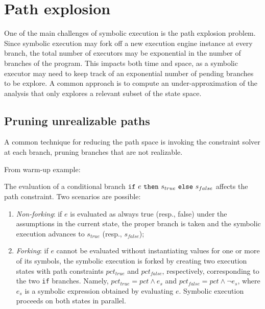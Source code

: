 
\section{Path explosion}

One of the main challenges of symbolic execution is the path explosion problem. Since symbolic execution may fork off a new execution engine instance at every branch, the total number of executors may be exponential in the number of branches of the program. This impacts both time and space, as a symbolic executor may need to keep track of an exponential number of pending branches to be explore. A common approach is to compute an under-approximation of the analysis that only explores a relevant subset of the state space.

\subsection{Pruning unrealizable paths}
\label{ss:unrealizable-paths}

A common technique for reducing the path space is invoking the constraint solver at each branch, pruning branches that are not realizable. 

From warm-up example:

The evaluation of a conditional branch ${\tt if}~e~{\tt then}~s_{true}~{\tt else}~s_{false}$ affects the path constraint. Two scenarios are possible:
    \begin{enumerate}
      \item {\em Non-forking}: if $e$ is evaluated as always true (resp., false) under the assumptions in the current state, the proper branch is taken and the symbolic execution advances to $s_{true}$ (resp., $s_{false}$);
      \item {\em Forking}: if $e$ cannot be evaluated without instantiating values for one or more of its symbols, the symbolic execution is forked by creating two execution states with path constraints $pct_{true}$ and $pct_{false}$, respectively, corresponding to the two {\tt if} branches. Namely, $pct_{true}=pct \wedge e_s$ and $pct_{false}=pct \wedge \neg e_s$, where $e_s$ is a symbolic expression obtained by evaluating $e$. 
    Symbolic execution proceeds on both states in parallel.
    \end{enumerate}


